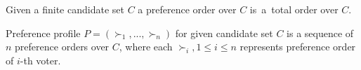 \begin{defn}
Given a finite candidate set $C$ a preference order over $C$
is~a~total order over $C$.
\end{defn}

\begin{defn}
Preference profile $P = (\succ_1, ... , \succ_n)$ for given candidate set $C$
is a sequence of $n$ preference orders over $C$,
where each $\succ_i, 1 \leq i \leq n$ represents preference order of $i$-th voter.
\end{defn}



